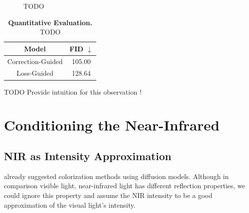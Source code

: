 \begin{figure}[htp!]
\begin{tabularx}{\textwidth}{>{\centering\arraybackslash}X >{\centering\arraybackslash}X >{\centering\arraybackslash}X >{\centering\arraybackslash}X >{\centering\arraybackslash}X >{\centering\arraybackslash}X}
    \end{tabularx}
    \caption{
        TODO
    }
    \label{fig:qualitative-evaluation-loss-guided-vs-correction-guided}
\end{figure}

\begin{table}[htp!]
    \centering
    \begin{tabular}{c | c}
        Model             & FID  $\downarrow$ \\
        \hline\hline
        Correction-Guided & 105.00            \\
        Loss-Guided       & 128.64
    \end{tabular}
    \caption{
        \textbf{Quantitative Evaluation.} TODO
    }
    \label{fig:quantitative-evaluation-loss-guided-vs-correction-guided}
\end{table}


TODO Provide intuition for this observation !

\section{Conditioning the Near-Infrared}
\subsection{NIR as Intensity Approximation}
\label{sec:conditioning-the-near-infrared}
\Textcite{sbgm} already suggested colorization methods using diffusion models.
Although in comparison visible light, near-infrared light has different reflection properties,
we could ignore this property and assume the NIR intensity to be a good approximation of the visual light's intensity.

